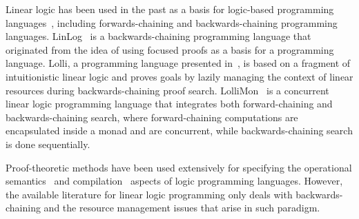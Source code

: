 Linear logic has been used in the past as a basis for logic-based programming
languages~\cite{Miller85anoverview}, including forwards-chaining and
backwards-chaining programming languages.
LinLog~\cite{Andreoli92logicprogramming} is a backwards-chaining programming
language that originated from the idea of using focused proofs as a basis for a
programming language.  Lolli, a programming language presented
in~\cite{Hodas94logicprogramming}, is based on a fragment of intuitionistic
linear logic and proves goals by lazily managing the context of linear resources
during backwards-chaining proof search.
LolliMon~\cite{Lopez:2005:MCL:1069774.1069778} is a concurrent linear logic
programming language that integrates both forward-chaining and
backwards-chaining search, where forward-chaining computations are encapsulated
inside a monad and are concurrent, while backwards-chaining search is done
sequentially.

Proof-theoretic methods have been used extensively for specifying the
operational semantics~\cite{Cervesato96efficientresource} and
compilation~\cite{DBLP:journals/corr/abs-1210-1653} aspects of logic programming
languages. However, the available literature for linear logic programming only
deals with backwards-chaining and the resource management issues that arise in
such paradigm.
